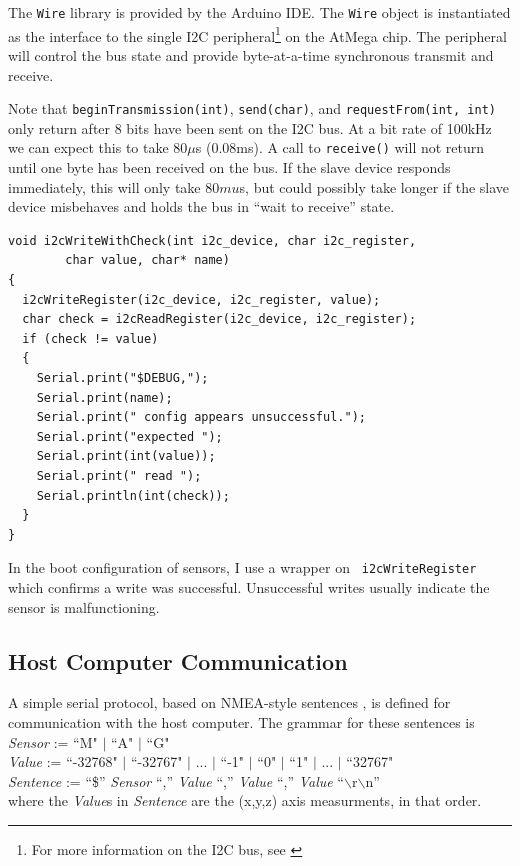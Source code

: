 \documentclass[12pt]{report}
\begin{document}
The \lstinline$Wire$ library is provided by the Arduino IDE.  The \lstinline$Wire$ object is instantiated as the interface to the single I2C peripheral\footnote{For more information on the I2C bus, see \cite{wikii2c}} on the AtMega chip. The peripheral will control the bus state and provide byte-at-a-time synchronous transmit and receive. 

Note that \lstinline$beginTransmission(int)$, \lstinline$send(char)$, and \lstinline$requestFrom(int, int)$ only return after 8 bits have been sent on the I2C bus. At a bit rate of 100kHz we can expect this to take 80$\mu$s (0.08ms). A call to \lstinline$receive()$ will not return until one byte has been received on the bus. If the slave device responds immediately, this will only take 80$mu$s, but could possibly take longer if the slave device misbehaves and holds the bus in ``wait to receive'' state.
\begin{lstlisting}
void i2cWriteWithCheck(int i2c_device, char i2c_register, 
        char value, char* name)
{
  i2cWriteRegister(i2c_device, i2c_register, value);
  char check = i2cReadRegister(i2c_device, i2c_register);
  if (check != value)
  {
    Serial.print("$DEBUG,");
    Serial.print(name);
    Serial.print(" config appears unsuccessful.");
    Serial.print("expected ");
    Serial.print(int(value));
    Serial.print(" read ");
    Serial.println(int(check));
  }
}
\end{lstlisting}
In the boot configuration of sensors, I use a wrapper on \lstinline$ i2cWriteRegister $ which confirms a write was successful. Unsuccessful writes usually indicate the sensor is malfunctioning.


\subsection{Host Computer Communication}
A simple serial protocol, based on NMEA-style sentences \cite{gpsinfonmea}, is defined for communication with the host computer. The grammar for these sentences is \\
\emph{Sensor} := ``M" $|$ ``A" $|$ ``G" \\
\emph{Value} := ``-32768" $|$ ``-32767" $|$ ... $|$ ``-1" $|$ ``0" $|$ ``1" $|$ ... $|$ ``32767" \\
\emph{Sentence} := ``\$'' \emph{Sensor} ``,'' \emph{Value} ``,'' \emph{Value} ``,'' \emph{Value} ``$\backslash$r$\backslash$n'' \\
where the \emph{Value}s in \emph{Sentence} are the (x,y,z) axis measurments, in that order.
\end{document}
